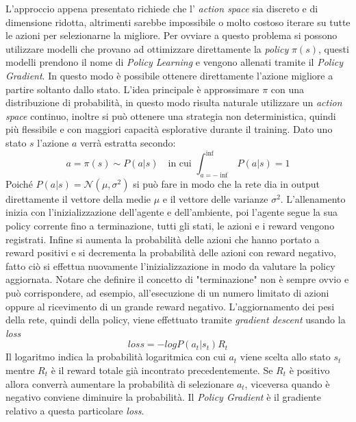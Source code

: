 
L'approccio appena presentato richiede che l' \emph{action space} sia discreto e di dimensione ridotta, altrimenti sarebbe impossibile o molto costoso iterare su tutte le azioni per selezionarne la migliore.
Per ovviare a questo problema si possono utilizzare modelli che provano ad ottimizzare direttamente la \emph{policy} $\pi(s)$, questi modelli prendono il nome di \emph{Policy Learning} e vengono allenati tramite il \emph{Policy Gradient}. 
In questo modo è possibile ottenere direttamente l'azione migliore a partire soltanto dallo stato.
L'idea principale è approssimare $\pi$ con una distribuzione di probabilità, in questo modo risulta naturale utilizzare un \emph{action space} continuo, inoltre si può ottenere una strategia non deterministica, quindi più flessibile e con maggiori capacità esplorative durante il training.
Dato uno stato $s$ l'azione $a$ verrà estratta secondo:
$$
a = 
\pi(s) \sim P(a|s) \quad\textrm{in cui } \int_{a = - \inf}^{\inf} P(a | s) = 1
$$
Poiché $P(a|s)  = \mathcal{N}(\mu,\sigma ^2)$ si può fare in modo che la rete dia in output direttamente il vettore della medie $\mu$ e il vettore delle varianze $\sigma^2$.
L'allenamento inizia con l'inizializzazione dell'agente e dell'ambiente, poi l'agente segue la sua policy corrente fino a terminazione, tutti gli stati, le azioni e i reward vengono registrati.
Infine si aumenta la probabilità delle azioni che hanno portato a reward positivi e si decrementa la probabilità delle azioni con reward negativo, fatto ciò si effettua nuovamente l'inizializzazione in modo da valutare la policy aggiornata. 
Notare che definire il concetto di "terminazione" non è sempre ovvio e può corrispondere, ad esempio, all'esecuzione di un numero limitato di azioni oppure al ricevimento di un grande reward negativo.
L'aggiornamento dei pesi della rete, quindi della policy, viene effettuato tramite \emph{gradient descent} usando la \emph{loss}
$$
loss = - log P(a_t | s_t ) R_t
$$
Il logaritmo indica la probabilità logaritmica con cui $a_t$ viene scelta allo stato $s_t$ mentre $R_t$ è il reward totale già incontrato precedentemente.
Se $R_t$ è positivo allora converrà aumentare la probabilità di selezionare $a_t$, viceversa quando è negativo conviene diminuire la probabilità.
Il \emph{Policy Gradient} è il gradiente relativo a questa particolare \emph{loss}.


